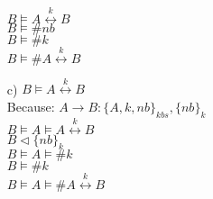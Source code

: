 \documentclass[10pt]{article}
\begin{document}
\begin{itemize}
			\(B \vDash A \overset{k}{\longleftrightarrow} B\)\\
			\(B \vDash \# nb\)\\
			\(B \vDash \# k\)\\
			\(B \vDash \# A \overset{k}{\longleftrightarrow} B\)
		\item[c)]
			\(B \vDash A \overset{k}{\longleftrightarrow} B\)\\
			Because:  \(A \rightarrow B: \{A, k, nb\}_{kbs},\{nb\}_{k}\)\\
			\(B \vDash A \vDash A \overset{k}{\longleftrightarrow} B\)\\
			\(B \vartriangleleft \{nb\}_{k}\)\\
			\(B \vDash A \vDash \# k\)\\
			\(B \vDash \# k\)\\
			\(B \vDash A \vDash \# A \overset{k}{\longleftrightarrow} B\)\\
			
	\end{itemize}   
\end{document}
